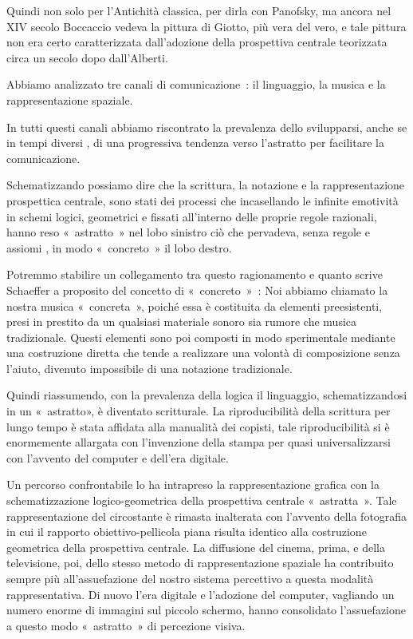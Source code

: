 \begin{itemize}
Quindi non solo per l’Antichità classica, per dirla con Panofsky, ma ancora nel
XIV secolo  Boccaccio vedeva la pittura di Giotto, più vera del vero, e tale
pittura non era certo caratterizzata dall’adozione della prospettiva centrale
teorizzata circa un secolo dopo dall’Alberti.

Abbiamo analizzato tre canali di comunicazione : il linguaggio, la musica e la
rappresentazione  spaziale.

In tutti questi canali abbiamo  riscontrato la prevalenza dello svilupparsi,
anche se in tempi diversi , di una progressiva tendenza verso l’astratto  per
facilitare la comunicazione.

Schematizzando possiamo dire che la scrittura, la notazione e la
rappresentazione prospettica centrale,  sono stati dei processi che
incasellando le infinite emotività  in schemi logici, geometrici e fissati
all’interno delle proprie regole razionali, hanno reso « astratto » nel lobo
sinistro  ciò che  pervadeva, senza regole  e assiomi , in modo « concreto »
il lobo destro.

Potremmo stabilire un collegamento tra questo ragionamento e  quanto scrive
Schaeffer  a proposito del concetto di « concreto » : Noi abbiamo chiamato
la nostra musica « concreta », poiché essa è costituita da elementi preesistenti,
presi in prestito da un qualsiasi materiale sonoro sia rumore  che musica
tradizionale. Questi elementi sono poi composti in modo sperimentale mediante
una costruzione diretta  che tende a realizzare una volontà  di composizione
senza l’aiuto, divenuto impossibile di una notazione tradizionale.

Quindi riassumendo, con la prevalenza della logica  il linguaggio,
schematizzandosi in un « astratto», è diventato scritturale. La riproducibilità
della scrittura per lungo tempo è stata affidata alla manualità dei copisti,
tale riproducibilità si è enormemente allargata con l’invenzione della stampa
per quasi  universalizzarsi con l’avvento del computer e dell’era digitale.

Un percorso confrontabile lo ha intrapreso la rappresentazione grafica con la
schematizzazione logico-geometrica della prospettiva centrale « astratta ».
Tale rappresentazione  del circostante è rimasta inalterata con l’avvento della
fotografia in cui il rapporto obiettivo-pellicola piana risulta identico alla
costruzione geometrica della prospettiva centrale. La diffusione  del cinema,
prima, e della televisione, poi, dello stesso metodo di rappresentazione
spaziale  ha contribuito sempre più all’assuefazione  del nostro sistema
percettivo  a questa modalità rappresentativa. Di nuovo l’era digitale e
l’adozione del computer, vagliando un numero enorme di immagini sul piccolo
schermo, hanno consolidato l’assuefazione a questo modo « astratto » di
percezione visiva.


\end{itemize}
